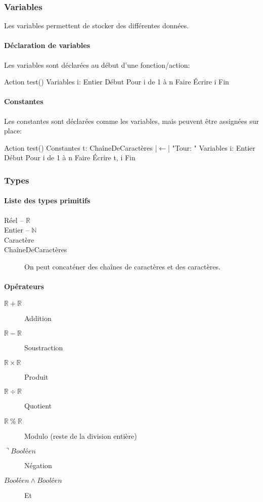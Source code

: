 \documentclass[10pt,a4paper,french]{article}
\begin{document}
\subsubsection{Variables}

Les variables permettent de stocker des différentes données.

\paragraph{Déclaration de variables}
Les variables sont déclarées au début d'une fonction/action:
\begin{exalgo}
Action test()
Variables
    i: Entier
Début
    Pour i de 1 à n Faire
        Écrire i
Fin
\end{exalgo}

\paragraph{Constantes}
Les constantes sont déclarées comme les variables, mais peuvent être assignées sur place:
\begin{exalgo}
Action test()
Constantes
    t: ChaîneDeCaractères |$\leftarrow$| "Tour: "
Variables
    i: Entier
Début
    Pour i de 1 à n Faire
        Écrire t, i
Fin
\end{exalgo}

\subsubsection{Types}

\paragraph{Liste des types primitifs}
\begin{description}
\item[Réel -- $\mathbb{R}$]
\item[Entier -- $\mathbb{N}$]
\item[Caractère]
\item[ChaîneDeCaractères] On peut concaténer des chaînes de caractères et des caractères.
\end{description}

\paragraph{Opérateurs}
\begin{description}
\item[$\mathbb{R} + \mathbb{R}$] Addition
\item[$\mathbb{R} - \mathbb{R}$] Soustraction
\item[$\mathbb{R} \times \mathbb{R}$] Produit
\item[$\mathbb{R} \div \mathbb{R}$] Quotient
\item[$\mathbb{R}~\%~\mathbb{R}$] Modulo (reste de la division entière)
\item[$\urcorner Booléen$] Négation
\item[$Booléen \wedge Booléen$] Et
\end{description}
\end{document}
